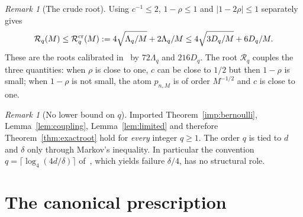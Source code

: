 \documentclass[11pt,a4paper]{article}
\theoremstyle{definition}
\theoremstyle{remark}
\newtheorem{remark}[theorem]{Remark}
\numberwithin{equation}{section}
\newcommand{\Rex}{\mathcal R}
\begin{document}
\begin{remark}[The crude root]\label{rem:crude}
Using $c^{-1}\le2$, $1-\rho\le1$ and $|1-2\rho|\le1$ separately gives
\begin{equation}\label{eq:crude}
 \Rex_q(M)\le\Rex^{\rm cr}_q(M):=4\sqrt{\Lambda_q/M}+2\Lambda_q/M
 \le4\sqrt{3D_q/M}+6D_q/M .
\end{equation}
These are the roots calibrated in~\cite{HY} by $72\Lambda_q$ and $216D_q$.
The root $\Rex_q$ couples the three quantities: when $\rho$ is close to one,
$c$ can be close to $1/2$ but then $1-\rho$ is small; when $1-\rho$ is not
small, the atom $p_{n,M}$ is of order $M^{-1/2}$ and $c$ is close to one.
\end{remark}

\begin{remark}[No lower bound on $q$]\label{rem:noq}
Imported Theorem~\ref{imp:bernoulli}, Lemma~\ref{lem:coupling},
Lemma~\ref{lem:limited} and therefore Theorem~\ref{thm:exactroot} hold for
\emph{every} integer $q\ge1$. The order $q$ is tied to $d$ and $\delta$ only
through Markov's inequality. In particular the convention
$q=\lceil\log_4(4d/\delta)\rceil$ of~\cite{V11,HY}, which yields failure
$\delta/4$, has no structural role.
\end{remark}


\section{The canonical prescription}\label{sec:canonical}
\end{document}
